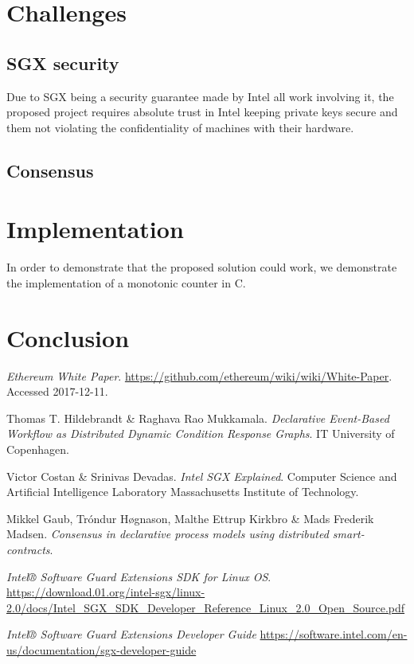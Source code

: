 \documentclass{article}
\newcommand\cpp{C\nolinebreak[4]\hspace{-.05em}\raisebox{.4ex}{\relsize{-3}{\textbf{++}}}}
\begin{document}
	\section{Challenges}

		\subsection{SGX security}

		Due to SGX being a security guarantee made by Intel all work involving it, the proposed project requires absolute trust in Intel keeping private keys secure and them not violating the confidentiality of machines with their hardware.

		\subsection{Consensus}	

	\section{Implementation}

	In order to demonstrate that the proposed solution could work, we demonstrate the implementation of a monotonic counter in \cpp.

	\section{Conclusion}

	\begin{thebibliography}{9}

		\textit{Ethereum White Paper}.
		\url{https://github.com/ethereum/wiki/wiki/White-Paper}.
		Accessed 2017-12-11.

		Thomas T. Hildebrandt \& Raghava Rao Mukkamala.
		\textit{Declarative Event-Based Workflow as Distributed Dynamic Condition Response Graphs}.
		IT University of Copenhagen.

		Victor Costan \& Srinivas Devadas.
		\textit{Intel SGX Explained}.
		Computer Science and Artificial Intelligence Laboratory Massachusetts Institute of Technology.

		Mikkel Gaub, Tróndur Høgnason, Malthe Ettrup Kirkbro \& Mads Frederik Madsen.
		\textit{Consensus in declarative process models using distributed smart-contracts}.

		\textit{Intel® Software Guard Extensions SDK for Linux OS}.
		\url{https://download.01.org/intel-sgx/linux-2.0/docs/Intel_SGX_SDK_Developer_Reference_Linux_2.0_Open_Source.pdf}

		\textit{Intel® Software Guard Extensions Developer Guide}
		\url{https://software.intel.com/en-us/documentation/sgx-developer-guide}

	\end{thebibliography}
\end{document}
